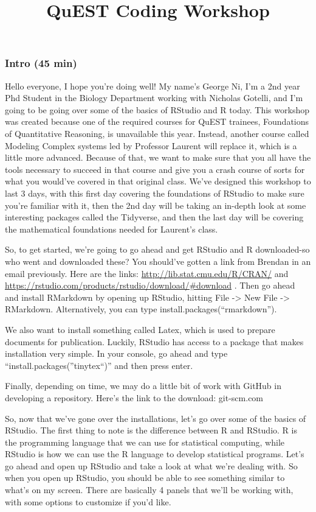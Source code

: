 \documentclass[
]{article}
\title{QuEST Coding Workshop}
\author{}
\date{\vspace{-2.5em}}
\begin{document}
\maketitle

\hypertarget{intro-45-min}{%
\subsubsection{Intro (45 min)}\label{intro-45-min}}

Hello everyone, I hope you're doing well! My name's George Ni, I'm a 2nd
year Phd Student in the Biology Department working with Nicholas
Gotelli, and I'm going to be going over some of the basics of RStudio
and R today. This workshop was created because one of the required
courses for QuEST trainees, Foundations of Quantitative Reasoning, is
unavailable this year. Instead, another course called Modeling Complex
systems led by Professor Laurent will replace it, which is a little more
advanced. Because of that, we want to make sure that you all have the
tools necessary to succeed in that course and give you a crash course of
sorts for what you would've covered in that original class. We've
designed this workshop to last 3 days, with this first day covering the
foundations of RStudio to make sure you're familiar with it, then the
2nd day will be taking an in-depth look at some interesting packages
called the Tidyverse, and then the last day will be covering the
mathematical foundations needed for Laurent's class.

So, to get started, we're going to go ahead and get RStudio and R
downloaded-so who went and downloaded these? You should've gotten a link
from Brendan in an email previously. Here are the links:
\url{http://lib.stat.cmu.edu/R/CRAN/} and
\url{https://rstudio.com/products/rstudio/download/\#download} . Then go
ahead and install RMarkdown by opening up RStudio, hitting File
-\textgreater{} New File -\textgreater{} RMarkdown. Alternatively, you
can type install.packages(``rmarkdown'').

We also want to install something called Latex, which is used to prepare
documents for publication. Luckily, RStudio has access to a package that
makes installation very simple. In your console, go ahead and type
``install.packages(''tinytex``)'' and then press enter.

Finally, depending on time, we may do a little bit of work with GitHub
in developing a repository. Here's the link to the download: git-scm.com

So, now that we've gone over the installations, let's go over some of
the basics of RStudio. The first thing to note is the difference between
R and RStudio. R is the programming language that we can use for
statistical computing, while RStudio is how we can use the R language to
develop statistical programs. Let's go ahead and open up RStudio and
take a look at what we're dealing with. So when you open up RStudio, you
should be able to see something similar to what's on my screen. There
are basically 4 panels that we'll be working with, with some options to
customize if you'd like.
\end{document}

